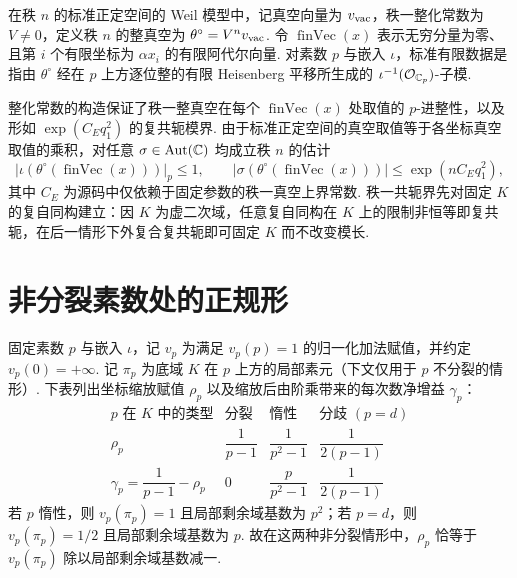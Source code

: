 \begin{definition}[整真空与标准有限数据]
\label{def:ch2-int-vacuum}
\emitthmsource
在秩 $n$ 的标准正定空间的 Weil 模型中，记真空向量为 $v_{\rm vac}$，秩一整化常数为 $V\ne0$，定义秩 $n$ 的整真空为 $\theta^\circ=V^n v_{\rm vac}$. 令 $\operatorname{finVec}(x)$ 表示无穷分量为零、且第 $i$ 个有限坐标为 $\alpha x_i$ 的有限阿代尔向量. 对素数 $p$ 与嵌入 $\iota$，标准有限数据是指由 $\theta^\circ$ 经在 $p$ 上方逐位整的有限 Heisenberg 平移所生成的 $\iota^{-1}(\mathcal{O}_{\mathbb{C}_p})$-子模.
\end{definition}

整化常数的构造保证了秩一整真空在每个 $\operatorname{finVec}(x)$ 处取值的 $p$-进整性，以及形如 $\exp(C_Eq_1^2)$ 的复共轭模界. 由于标准正定空间的真空取值等于各坐标真空取值的乘积，对任意 $\sigma\in\operatorname{Aut}(\mathbb{C})$ 均成立秩 $n$ 的估计
\begin{equation}
\label{eq:ch2-vacuum-bounds}
 \bigl|\iota(\theta^\circ(\operatorname{finVec}(x)))\bigr|_p\le1,\qquad
 \bigl|\sigma(\theta^\circ(\operatorname{finVec}(x)))\bigr|
 \le\exp(nC_Eq_1^2),
\end{equation}
其中 $C_E$ 为源码中仅依赖于固定参数的秩一真空上界常数. 秩一共轭界先对固定 $K$ 的复自同构建立：因 $K$ 为虚二次域，任意复自同构在 $K$ 上的限制非恒等即复共轭，在后一情形下外复合复共轭即可固定 $K$ 而不改变模长.

\section{非分裂素数处的正规形}
\label{sec:ch2-normal-form}

固定素数 $p$ 与嵌入 $\iota$，记 $v_p$ 为满足 $v_p(p)=1$ 的归一化加法赋值，并约定 $v_p(0)=+\infty$. 记 $\pi_p$ 为底域 $K$ 在 $p$ 上方的局部素元（下文仅用于 $p$ 不分裂的情形）. 下表列出坐标缩放赋值 $\rho_p$ 以及缩放后由阶乘带来的每次数净增益 $\gamma_p$：
\begin{equation}
\label{eq:ch2-slopes}
\begin{array}{c|ccc}
p\text{ 在 }K\text{ 中的类型}&\text{分裂}&\text{惰性}&\text{分歧 }(p=d)\\ \hline
\rho_p &\dfrac1{p-1}&\dfrac1{p^2-1}&\dfrac1{2(p-1)}\\[3pt]
\gamma_p=\dfrac1{p-1}-\rho_p
  &0&\dfrac{p}{p^2-1}&\dfrac1{2(p-1)}
\end{array}
\end{equation}
若 $p$ 惰性，则 $v_p(\pi_p)=1$ 且局部剩余域基数为 $p^2$；若 $p=d$，则 $v_p(\pi_p)=1/2$ 且局部剩余域基数为 $p$. 故在这两种非分裂情形中，$\rho_p$ 恰等于 $v_p(\pi_p)$ 除以局部剩余域基数减一.

